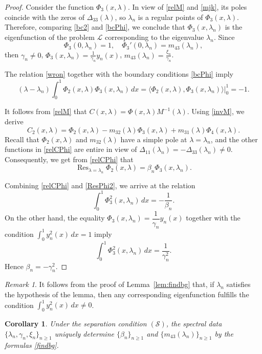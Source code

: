 \documentclass[a4paper,12pt]{article}
\newcommand{\be}{\beta}
\newcommand{\ga}{\gamma}
\newcommand{\la}{\lambda}
\theoremstyle{plain}
\numberwithin{equation}{section}
\newtheorem{cor}[thm]{Corollary}
\theoremstyle{definition}
\theoremstyle{remark}
\newtheorem{remark}[thm]{Remark}
\DeclareMathOperator*{\Res}{Res}
\begin{document}
\begin{proof}
Consider the function $\Phi_3(x, \la)$. In view of \eqref{relM} and \eqref{mjk}, its poles coincide with the zeros of $\Delta_{33}(\la)$, so $\la_n$ is a regular points of $\Phi_3(x, \la)$.
Therefore, comparing \eqref{bc2} and \eqref{bcPhi}, we conclude that $\Phi_3(x, \la_n)$ is the eigenfunction of the problem $\mathcal L$ corresponding to the eigenvalue $\la_n$. Since
$$
\Phi_3(0, \la_n) = 1, \quad \Phi_3'(0, \la_n) = m_{43}(\la_n),
$$
then $\ga_n \ne 0$, $\Phi_3(x, \la_n) = \frac{1}{\ga_n} y_n(x)$, 
$m_{43}(\la_n) = \frac{\xi_n}{\ga_n}$.

The relation \eqref{wron} together with the boundary conditions \eqref{bcPhi} imply
$$
(\la - \la_n) \int_0^1 \Phi_2(x, \la) \Phi_3(x, \la_n) \, dx = \langle \Phi_2(x, \la), \Phi_3(x, \la_n) \rangle \big|_0^1 = -1.
$$

It follows from \eqref{relM} that $C(x, \la) = \Phi(x, \la) M^{-1}(\la)$. Using \eqref{invM}, we derive
\begin{equation} \label{relCPhi}
C_2(x, \la) = \Phi_2(x, \la) - m_{32}(\la) \Phi_3(x, \la) + m_{31}(\la) \Phi_4(x, \la).
\end{equation}
Recall that $\Phi_2(x, \la)$ and $m_{32}(\la)$ have a simple pole at $\la = \la_n$, and the other functions in \eqref{relCPhi} are entire in view of $\Delta_{11}(\la_n) = -\Delta_{33}(\la_n) \ne 0$.
Consequently, we get from \eqref{relCPhi} that
\begin{equation} \label{ResPhi2}
\Res_{\la = \la_n} \Phi_2(x, \la) = \be_n \Phi_3(x, \la_n).
\end{equation}

Combining \eqref{relCPhi} and \eqref{ResPhi2}, we arrive at the relation
$$
\int_0^1 \Phi_3^2(x, \la_n) \, dx = -\frac{1}{\be_n}.
$$
On the other hand, the equality $\Phi_3(x, \la_n) = \dfrac{1}{\ga_n} y_n(x)$ together with the condition $\int_0^1 y_n^2(x) \, dx = 1$ imply
$$
\int_0^1 \Phi_3^2(x, \la_n) \, dx = \frac{1}{\ga_n^2}.
$$
Hence $\be_n = -\ga_n^2$.
\end{proof}

\begin{remark} \label{rem:yn}
It follows from the proof of Lemma~\ref{lem:findbg} that, if $\la_n$ satisfies the hypothesis of the lemma, then any corresponding eigenfunction fulfills the condition $\int_0^1 y_n^2(x) \, dx \ne 0$.
\end{remark}

\begin{cor} \label{cor:findbg}
Under the separation condition $(\mathcal S)$, the spectral data $\{ \la_n, \ga_n, \xi_n \}_{n \ge 1}$ uniquely determine $\{ \be_n \}_{n \ge 1}$ and $\{ m_{43}(\la_n) \}_{n \ge 1}$ by the formulas \eqref{findbg}.
\end{cor}
\end{document}
